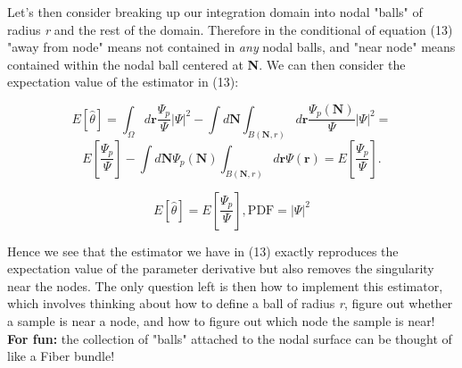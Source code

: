 \documentclass{article}
\begin{document}
Let's then consider breaking up our integration domain into nodal "balls" of radius \textit{r} and the rest of the domain. Therefore in the conditional of equation (13) "away from node" means not contained in \textit{any} nodal balls, and "near node" means contained within the nodal ball centered at \textbf{N}. We can then consider the expectation value of the estimator in (13):

$$
E[\hat{\theta}]=\int_{\Omega} d\textbf{r} \frac{\Psi_p}{\Psi} |\Psi|^2 - \int d\textbf{N} \int_{B(\textbf{N},r)} d\textbf{r} \frac{\Psi_p(\textbf{N})}{\Psi}|\Psi|^2 = 
$$
$$
E[\frac{\Psi_p}{\Psi}] - \int d\textbf{N} \Psi_p(\textbf{N}) \int_{B(\textbf{N},r)} d\textbf{r}\Psi(\textbf{r}) = E[\frac{\Psi_p}{\Psi}].
$$

\begin{equation}
\boxed{E[\hat{\theta}]=E[\frac{\Psi_p}{\Psi}], \text{PDF} = |\Psi|^2}
\end{equation}

Hence we see that the estimator we have in (13) exactly reproduces the expectation value of the parameter derivative but also removes the singularity near the nodes. The only question left is then how to implement this estimator, which involves thinking about how to define a ball of radius \textit{r}, figure out whether a sample is near a node, and how to figure out which node the sample is near! \textbf{For fun:} the collection of "balls" attached to the nodal surface can be thought of like a Fiber bundle!
\end{document}
